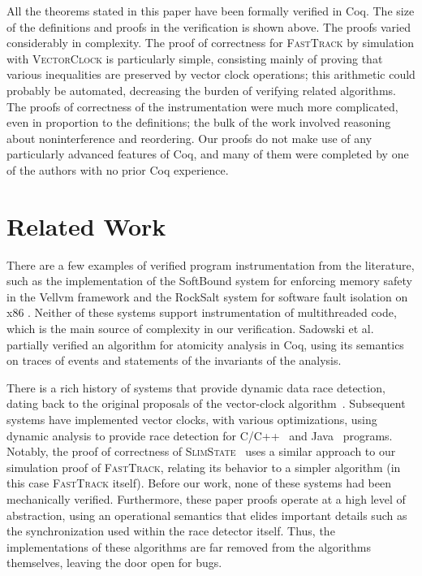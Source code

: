 \documentclass[preprint, 10pt]{sigplanconf}
\newcommand{\VCalg}{\textsc{VectorClock}\xspace}
\newcommand{\FT}{\textsc{FastTrack}\xspace}
\begin{document}
All the theorems stated in this paper have been formally verified in Coq. The size of the definitions and proofs in the verification is shown above. The proofs varied considerably in complexity. The proof of correctness for \FT by simulation with \VCalg is particularly simple, consisting mainly of proving that various inequalities are preserved by vector clock operations; this arithmetic could probably be automated, decreasing the burden of verifying related algorithms. The proofs of correctness of the instrumentation were much more complicated, even in proportion to the definitions; the bulk of the work involved reasoning about noninterference and reordering. Our proofs do not make use of any particularly advanced features of Coq, and many of them were completed by one of the authors with no prior Coq experience.

\section{Related Work}
\label{related}

There are a few examples of verified program instrumentation from the literature, such as
the implementation of the SoftBound system for enforcing memory safety in the Vellvm framework \cite{vellvm} and the RockSalt system for software fault isolation on x86 \cite{Morrisett:2012:RBF:2254064.2254111}. Neither of these systems support instrumentation of multithreaded code, which is the main source of complexity in our verification. Sadowski et al.~\cite{coqatomicity} partially verified an algorithm for atomicity analysis in Coq, using its semantics on traces of events and statements of the invariants of the analysis.

There is a rich history of systems that provide dynamic data race detection, dating back to the original proposals of the vector-clock algorithm~\cite{vcfidge,vcmattern,lamporthb}. Subsequent systems have implemented vector clocks, with various optimizations, using dynamic analysis to provide race detection for C/C++~\cite{pozniansky_efficient_2003,serebryany_threadsanitizer:_2009} and Java~\cite{christiaens_trade:_2001,elmas_goldilocks:_2007,fasttrack,slimstate} programs. Notably, the proof of correctness of \textsc{SlimState}~\cite{slimstate} uses a similar approach to our simulation proof of \FT, relating its behavior to a simpler algorithm (in this case \FT itself). Before our work, none of these systems had been mechanically verified. Furthermore, these paper proofs operate at a high level of abstraction, using an operational semantics that elides important details such as the synchronization used within the race detector itself. Thus, the implementations of these algorithms are far removed from the algorithms themselves, leaving the door open for bugs.
\end{document}
